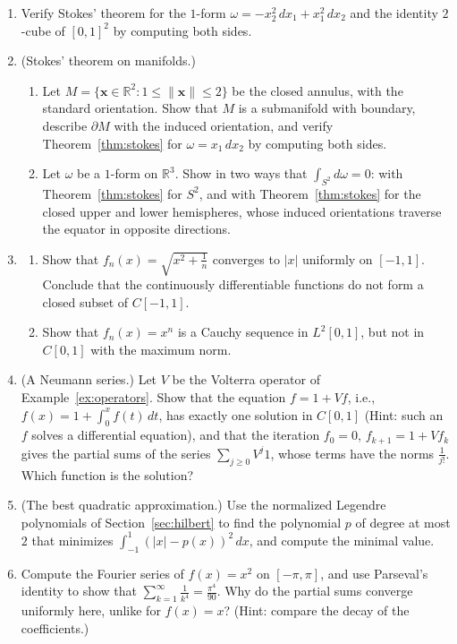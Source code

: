 \documentclass[11pt]{article}
\newcommand{\norm}[1]{\lVert #1 \rVert}
\theoremstyle{definition}
\theoremstyle{plain}
\theoremstyle{remark}
\begin{document}
\begin{enumerate}[leftmargin=*]
\begin{enumerate}[label=(\alph*)]
    \end{enumerate}
    \item Verify Stokes' theorem for the $1$-form $\omega = -x_2^2\, dx_1 + x_1^2\, dx_2$ and the identity $2$-cube of $[0, 1]^2$ by computing both sides.
    \item (Stokes' theorem on manifolds.)
    \begin{enumerate}[label=(\alph*)]
        \item Let $M = \{\mathbf{x} \in \mathbb{R}^2 : 1 \leq \norm{\mathbf{x}} \leq 2\}$ be the closed annulus, with the standard orientation. Show that $M$ is a submanifold with boundary, describe $\partial M$ with the induced orientation, and verify Theorem~\ref{thm:stokes} for $\omega = x_1\, dx_2$ by computing both sides.
        \item Let $\omega$ be a $1$-form on $\mathbb{R}^3$. Show in two ways that $\int_{S^2} d\omega = 0$: with Theorem~\ref{thm:stokes} for $S^2$, and with Theorem~\ref{thm:stokes} for the closed upper and lower hemispheres, whose induced orientations traverse the equator in opposite directions.
    \end{enumerate}
    \item \begin{enumerate}[label=(\alph*)]
        \item Show that $f_n(x) = \sqrt{x^2 + \frac{1}{n}}$ converges to $|x|$ uniformly on $[-1, 1]$. Conclude that the continuously differentiable functions do not form a closed subset of $C[-1, 1]$.
        \item Show that $f_n(x) = x^n$ is a Cauchy sequence in $L^2[0, 1]$, but not in $C[0, 1]$ with the maximum norm.
    \end{enumerate}
    \item (A Neumann series.) Let $V$ be the Volterra operator of Example~\ref{ex:operators}. Show that the equation $f = 1 + Vf$, i.e., $f(x) = 1 + \int_0^x f(t)\, dt$, has exactly one solution in $C[0, 1]$ (Hint: such an $f$ solves a differential equation), and that the iteration $f_0 = 0$, $f_{k+1} = 1 + Vf_k$ gives the partial sums of the series $\sum_{j \geq 0} V^j1$, whose terms have the norms $\frac{1}{j!}$. Which function is the solution?
    \item (The best quadratic approximation.) Use the normalized Legendre polynomials of Section~\ref{sec:hilbert} to find the polynomial $p$ of degree at most $2$ that minimizes $\int_{-1}^1 (|x| - p(x))^2\, dx$, and compute the minimal value.
    \item Compute the Fourier series of $f(x) = x^2$ on $[-\pi, \pi]$, and use Parseval's identity to show that $\sum_{k=1}^\infty \frac{1}{k^4} = \frac{\pi^4}{90}$. Why do the partial sums converge uniformly here, unlike for $f(x) = x$? (Hint: compare the decay of the coefficients.)

\end{enumerate}
\end{document}

